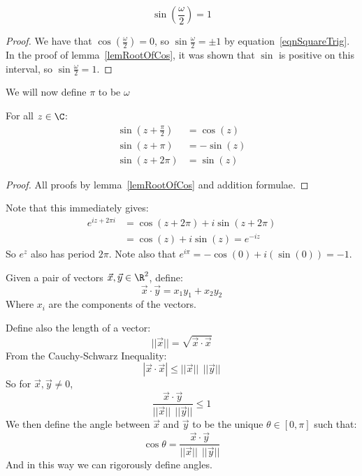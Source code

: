 \documentclass[../Main.tex]{subfiles}
\begin{document}
\begin{corollary}
    \begin{equation*}
        \sin\left(\frac{\omega}{2}\right) = 1
    \end{equation*}
\end{corollary}
\begin{proof}
    We have that $\cos\left(\frac{\omega}{2}\right) = 0$, so $\sin\frac{\omega}{2} = \pm 1$ by equation~\ref{eqnSquareTrig}. In the proof of lemma~\ref{lemRootOfCos}, it was shown that $\sin$ is positive on this interval, so $\sin\frac{\omega}{2} = 1$.
\end{proof}
We will now define $\pi$ to be $\omega$
\begin{theorem}
    For all $z \in \C$:
    \begin{align*}
        \sin\left(z + \frac{\pi}{2}\right) &= \cos(z) \\
        \sin\left(z + \pi\right) &= -\sin(z) \\
        \sin\left(z + 2\pi\right) &= \sin(z)
    \end{align*}
    \label{thmTrigPeriodicity}
\end{theorem}
\begin{proof}
    All proofs by lemma~\ref{lemRootOfCos} and addition formulae.
\end{proof}
Note that this immediately gives:
\begin{align*}
    e^{iz + 2\pi i} &= \cos(z + 2\pi) + i\sin(z + 2\pi) \\
    &= \cos(z) + i\sin(z) = e^{-iz}
\end{align*}
So $e^z$ also has period $2\pi$. Note also that $e^{i\pi} = -\cos(0) + i(\sin(0)) = -1$.\par
\begin{remark}
    Given a pair of vectors $\vec{x}, \vec{y} \in \R^2$, define:
    \begin{equation*}
        \vec{x} \cdot \vec{y} = x_1 y_1 + x_2 y_2
    \end{equation*}
    Where $x_i$ are the components of the vectors.\par
    Define also the length of a vector:
    \begin{equation*} 
        ||\vec{x}|| = \sqrt{\vec{x} \cdot \vec{x}}
    \end{equation*}
    From the Cauchy-Schwarz Inequality:
    \begin{equation*}
        |\vec{x} \cdot \vec{x}| \leq ||\vec{x}||~~||\vec{y}||
    \end{equation*}
    So for $\vec{x}, \vec{y} \neq 0$,
    \begin{equation*}
        \frac{\vec{x} \cdot \vec{y}}{||\vec{x}||~~||\vec{y}||} \leq 1
    \end{equation*}
    We then define the angle between $\vec{x}$ and $\vec{y}$ to be the unique $\theta \in [0, \pi]$ such that:
    \begin{equation*}
        \cos{\theta} = \frac{\vec{x} \cdot \vec{y}}{||\vec{x}||~~||\vec{y}||}
    \end{equation*}
    And in this way we can rigorously define angles.
\end{remark}
\end{document}
